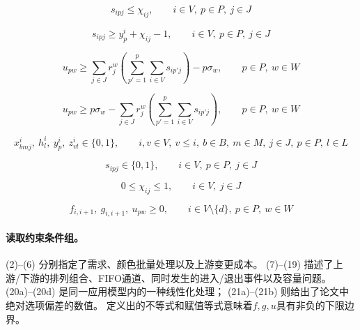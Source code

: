 \documentclass[10pt,a4paper]{article}
\begin{document}
\begin{equation}
s_{ipj} \le \chi_{ij},
\qquad i \in V,\ p \in P,\ j \in J
\tag{20c}
\end{equation}

\begin{equation}
s_{ipj} \ge y_p^i + \chi_{ij} - 1,
\qquad i \in V,\ p \in P,\ j \in J
\tag{20d}
\end{equation}

\begin{equation}
u_{pw}
\ge
\sum_{j \in J} r_j^w
\left(
\sum_{p'=1}^{p} \sum_{i \in V} s_{ip'j}
\right)
- p \sigma_w,
\qquad p \in P,\ w \in W
\tag{21a}
\end{equation}

\begin{equation}
u_{pw}
\ge
p \sigma_w
- \sum_{j \in J} r_j^w
\left(
\sum_{p'=1}^{p} \sum_{i \in V} s_{ip'j}
\right),
\qquad p \in P,\ w \in W
\tag{21b}
\end{equation}

\begin{equation}
x_{bmj}^i,\ h_l^i,\ y_p^i,\ z_{vl}^i \in \{0,1\},
\qquad
i,v \in V,\ v \le i,\ b \in B,\ m \in M,\ j \in J,\ p \in P,\ l \in L
\tag{22}
\end{equation}

\begin{equation}
s_{ipj} \in \{0,1\},
\qquad i \in V,\ p \in P,\ j \in J
\tag{23}
\end{equation}

\begin{equation}
0 \le \chi_{ij} \le 1,
\qquad i \in V,\ j \in J
\tag{24}
\end{equation}

\begin{equation}
f_{i,i+1},\ g_{i,i+1},\ u_{pw} \ge 0,
\qquad i \in V \setminus \{d\},\ p \in P,\ w \in W
\tag{25}
\end{equation}

\paragraph{读取约束条件组。}
(2)--(6) 分别指定了需求、颜色批量处理以及上游变更成本。  
(7)--(19) 描述了上游/下游的排列组合、FIFO通道、同时发生的进入/退出事件以及容量问题。  
(20a)--(20d) 是同一应用模型内的一种线性化处理；  
(21a)--(21b) 则给出了论文中绝对选项偏差的数值。  
定义出的不等式和赋值等式意味着$f,g,u$具有非负的下限边界。
\end{document}
